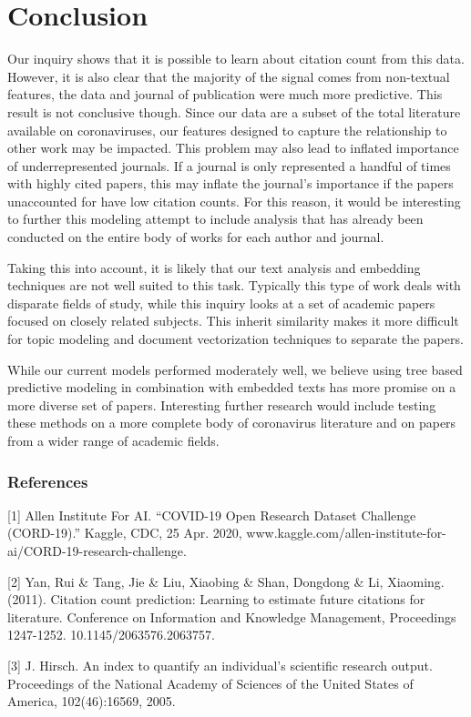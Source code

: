 \documentclass{article} %
\begin{document}
\section{Conclusion}
\label{conclusion}

Our inquiry shows that it is possible to learn about citation count from this data. However, it is also  clear that the majority of the signal comes from non-textual features, the data and journal of publication were much more predictive. This result is not conclusive though. Since our data are a subset of the total literature available on coronaviruses, our features designed to capture the relationship to other work may be impacted. This problem may also lead to inflated importance of underrepresented journals. If a journal is only represented a handful of times with highly cited papers, this may inflate the journal's importance if the papers unaccounted for have low citation counts. For this reason, it would be interesting to further this modeling attempt to include analysis that has already been conducted on the entire body of works for each author and journal.  

Taking this into account, it is likely that our text analysis and embedding techniques are not well suited to this task. Typically this type of work deals with disparate fields of study, while this inquiry looks at a set of academic papers focused on closely related subjects. This inherit similarity makes it more difficult for topic modeling and document vectorization techniques to separate the papers.

While our current models performed moderately well, we believe using tree based predictive modeling in combination with embedded texts has more promise on a more diverse set of papers. Interesting further research would include testing these methods on a more complete body of coronavirus literature and on papers from a wider range of academic fields. 

\newpage
\subsubsection*{References}

\small{
[1] Allen Institute For AI. “COVID-19 Open Research Dataset Challenge (CORD-19).” Kaggle, CDC, 25 Apr. 2020, www.kaggle.com/allen-institute-for-ai/CORD-19-research-challenge.

[2] Yan, Rui \& Tang, Jie \& Liu, Xiaobing \& Shan, Dongdong \& Li, Xiaoming. (2011). Citation count prediction: Learning to estimate future citations for literature. {\itInternational Conference on  Information and Knowledge Management, Proceedings} 1247-1252. 10.1145/2063576.2063757. 

[3] J. Hirsch. An index to quantify an individual’s scientific
research output. Proceedings of the National Academy of
Sciences of the United States of America, 102(46):16569,
2005.
}
\end{document}
